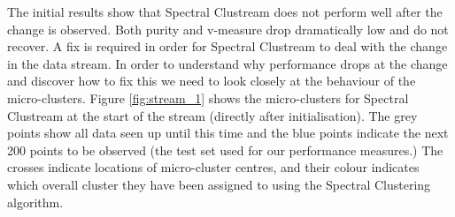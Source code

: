 The initial results show that Spectral Clustream does not perform well after the change is observed. Both purity and v-measure drop dramatically low and do not recover. A fix is required in order for Spectral Clustream to deal with the change in the data stream. In order to understand why performance drops at the change and discover how to fix this we need to look closely at the behaviour of the  micro-clusters. Figure \ref{fig:stream_1} shows the micro-clusters for Spectral Clustream at the start of the stream (directly after initialisation). The grey points show all data seen up until this time and the blue points indicate the next 200 points to be observed (the test set used for our performance measures.) The crosses indicate locations of micro-cluster centres, and their colour indicates which overall cluster they have been assigned to using the Spectral Clustering algorithm. 

